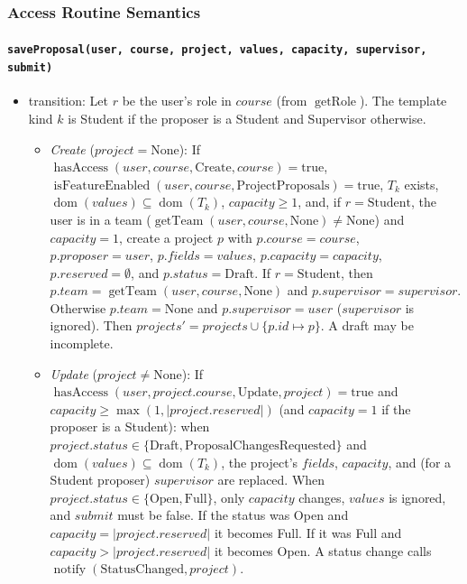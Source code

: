 \documentclass[12pt, titlepage]{article}
\begin{document}
\subsubsection{Access Routine Semantics}

\paragraph{\texttt{saveProposal(user, course, project, values, capacity, supervisor, submit)}}
\begin{itemize}
    \item transition: Let $r$ be the user's role in $course$ (from $\operatorname{getRole}$). The template kind $k$ is Student if the proposer is a Student and Supervisor otherwise.
    \begin{itemize}
        \item \emph{Create} ($project=\text{None}$): If $\operatorname{hasAccess}(user,course,\text{Create},course)=\text{true}$, $\operatorname{isFeatureEnabled}(user,course,\text{ProjectProposals})=\text{true}$, $T_k$ exists, $\operatorname{dom}(values)\subseteq\operatorname{dom}(T_k)$, $capacity\ge1$, and, if $r=\text{Student}$, the user is in a team ($\operatorname{getTeam}(user,course,\text{None})\ne\text{None}$) and $capacity=1$, create a project $p$ with $p.course=course$, $p.proposer=user$, $p.fields=values$, $p.capacity=capacity$, $p.reserved=\emptyset$, and $p.status=\text{Draft}$. If $r=\text{Student}$, then $p.team=\operatorname{getTeam}(user,course,\text{None})$ and $p.supervisor=supervisor$. Otherwise $p.team=\text{None}$ and $p.supervisor=user$ ($supervisor$ is ignored). Then $\mathit{projects}'=\mathit{projects}\cup\{p.id\mapsto p\}$. A draft may be incomplete.
        \item \emph{Update} ($project\ne\text{None}$): If $\operatorname{hasAccess}(user,project.course,\text{Update},project)=\text{true}$ and $capacity\ge\max(1,|project.reserved|)$ (and $capacity=1$ if the proposer is a Student): when $project.status\in\{\text{Draft},\text{ProposalChangesRequested}\}$ and $\operatorname{dom}(values)\subseteq\operatorname{dom}(T_k)$, the project's $fields$, $capacity$, and (for a Student proposer) $supervisor$ are replaced. When $project.status\in\{\text{Open},\text{Full}\}$, only $capacity$ changes, $values$ is ignored, and $submit$ must be false. If the status was Open and $capacity=|project.reserved|$ it becomes Full. If it was Full and $capacity>|project.reserved|$ it becomes Open. A status change calls $\operatorname{notify}(\text{StatusChanged},project)$.

\end{itemize}
\end{itemize}
\end{document}
